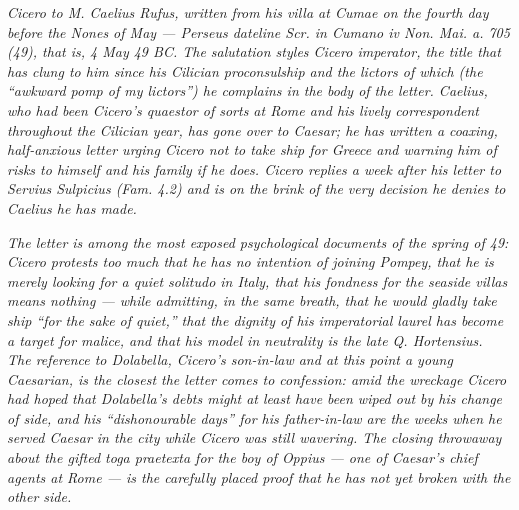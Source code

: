 
\textit{Cicero to M. Caelius Rufus, written from his villa
at Cumae on the fourth day before the Nones of May ---
Perseus dateline \textit{Scr. in Cumano iv Non. Mai. a. 705
(49)}, that is, 4 May 49 BC. The salutation styles Cicero
\textit{imperator}, the title that has clung to him since his
Cilician proconsulship and the lictors of which (the ``awkward
pomp of my lictors'') he complains in the body of the letter.
Caelius, who had been Cicero's quaestor of sorts at Rome and
his lively correspondent throughout the Cilician year, has
gone over to Caesar; he has written a coaxing, half-anxious
letter urging Cicero not to take ship for Greece and warning
him of risks to himself and his family if he does. Cicero
replies a week after his letter to Servius Sulpicius (Fam.
4.2) and is on the brink of the very decision he denies to
Caelius he has made.}

\textit{The letter is among the most exposed psychological
documents of the spring of 49: Cicero protests too much that
he has no intention of joining Pompey, that he is merely
looking for a quiet \textit{solitudo} in Italy, that his
fondness for the seaside villas means nothing --- while
admitting, in the same breath, that he would gladly take ship
``for the sake of quiet,'' that the dignity of his imperatorial
laurel has become a target for malice, and that his model in
neutrality is the late Q. Hortensius. The reference to
Dolabella, Cicero's son-in-law and at this point a young
Caesarian, is the closest the letter comes to confession:
amid the wreckage Cicero had hoped that Dolabella's debts
might at least have been wiped out by his change of side, and
his ``dishonourable days'' for his father-in-law are the
weeks when he served Caesar in the city while Cicero was
still wavering. The closing throwaway about the gifted
\textit{toga praetexta} for the boy of Oppius --- one of
Caesar's chief agents at Rome --- is the carefully placed
proof that he has not yet broken with the other side.}
